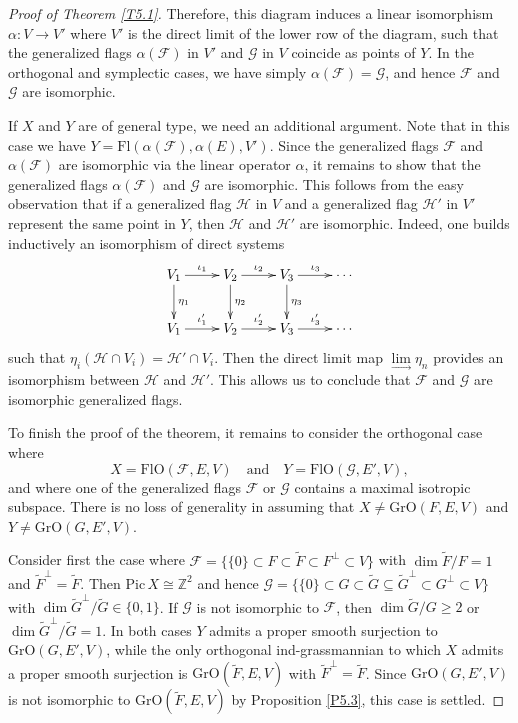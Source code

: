 \documentclass[12pt]{amsart}
\newcommand{\Flags}{\mathrm{Fl}}
\newcommand{\OFlags}{\mathrm{FlO}}
\newcommand{\OGrass}{\mathrm{GrO}}
\newcommand{\Pic}{\mathrm{Pic}}
\theoremstyle{definition}
\begin{document}
\begin{proof}[Proof of Theorem \ref{T5.1}]
Therefore, this diagram induces a linear isomorphism $\alpha:V\to V'$ where $V'$ is the direct limit of the lower row of the diagram, such that the generalized flags $\alpha(\mathcal{F})$ in $V'$ and $\mathcal{G}$ in $V$ coincide as points of $Y$.
In the orthogonal and symplectic cases, we have simply $\alpha(\mathcal{F})=\mathcal{G}$, and hence $\mathcal{F}$ and $\mathcal{G}$ are isomorphic.

If $X$ and $Y$ are of general type, we need an additional argument.
Note that in this case we have $Y=\Flags(\alpha(\mathcal{F}),\alpha(E),V')$.
Since the generalized flags $\mathcal{F}$ and $\alpha(\mathcal{F})$ are isomorphic via the linear operator $\alpha$, it remains to show that the generalized flags $\alpha(\mathcal{F})$ and $\mathcal{G}$ are isomorphic. This follows from the easy observation that if a generalized flag $\mathcal{H}$ in $V$ and a generalized flag $\mathcal{H}'$ in $V'$ represent the same point in  $Y$, then $\mathcal{H}$ and $\mathcal{H}'$ are isomorphic.
Indeed, one builds inductively an isomorphism of direct systems 
\begin{equation*}
\xymatrix{V_1 \ar[r]^{\iota_1} \ar[d]^{\eta_1} & V_2 \ar[r]^{\iota_2} \ar[d]^{\eta_2} & V_3 \ar[r]^{\iota_3} \ar[d]^{\eta_3} & \cdots \\
V_1  \ar[r]^{\iota'_1}  & V_2 \ar[r]^{\iota'_2}  & V_3 \ar[r]^{\iota'_3}  & \cdots }
\end{equation*}
such that $\eta_i(\mathcal{H}\cap V_i)=\mathcal{H}'\cap V_i$. Then the direct limit map $\lim\limits_\to\eta_n$ provides an isomorphism between $\mathcal{H}$ and $\mathcal{H}'$.
This allows us to conclude that $\mathcal{F}$ and $\mathcal{G}$ are isomorphic generalized flags.

To finish the proof of the theorem, it remains to consider the orthogonal case where
$$
X=\OFlags(\mathcal{F},E,V)\quad\mbox{and}\quad Y=\OFlags(\mathcal{G},E',V),
$$
and where one of the generalized flags $\mathcal{F}$ or $\mathcal{G}$ contains a maximal isotropic subspace.
There is no loss of generality in assuming that $X\not=\OGrass(F,E,V)$ and $Y\not=\OGrass(G,E',V)$.

Consider first the case where $\mathcal{F}=\{\{0\}\subset F\subset\tilde{F}\subset F^\perp\subset V\}$ with $\dim \tilde{F}/F=1$ and $\tilde{F}^\perp=\tilde{F}$. Then $\Pic\,X\cong\mathbb{Z}^2$ and hence $\mathcal{G}=\{\{0\}\subset G\subset\tilde{G}\subseteq\tilde{G}^\perp\subset G^\perp\subset V\}$ with $\dim\tilde{G}^\perp/\tilde{G}\in\{0,1\}$. If $\mathcal{G}$ is not isomorphic to $\mathcal{F}$, then $\dim \tilde{G}/G\geq 2$ or $\dim \tilde{G}^\perp/\tilde{G}=1$. In both cases $Y$ admits a proper smooth surjection to $\OGrass(G,E',V)$, while the only orthogonal ind-grassmannian to which $X$ admits a proper smooth surjection is $\OGrass(\tilde{F},E,V)$ with $\tilde{F}^\perp=\tilde{F}$.
Since $\OGrass(G,E',V)$ is not isomorphic to $\OGrass(\tilde{F},E,V)$ by Proposition \ref{P5.3}, this case is settled.
 

\end{proof}
\end{document}
